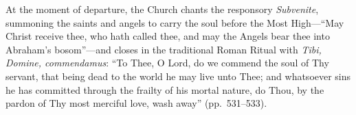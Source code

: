 At the moment of departure, the Church chants the responsory \emph{Subvenite}, summoning the saints and angels to carry the soul before the Most High---``May Christ receive thee, who hath called thee, and may the Angels bear thee into Abraham's bosom''---and closes in the traditional Roman Ritual with \emph{Tibi, Domine, commendamus}: ``To Thee, O Lord, do we commend the soul of Thy servant, that being dead to the world he may live unto Thee; and whatsoever sins he has committed through the frailty of his mortal nature, do Thou, by the pardon of Thy most merciful love, wash away'' (pp.\ 531--533).
